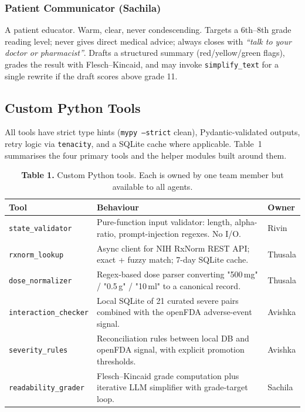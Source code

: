 \documentclass[11pt]{article}
\begin{document}
\subsubsection*{Patient Communicator (Sachila)}
A patient educator. Warm, clear, never condescending. Targets a
6th–8th grade reading level; never gives direct medical advice;
always closes with \emph{``talk to your doctor or pharmacist''}.
Drafts a structured summary (red/yellow/green flags), grades the
result with Flesch–Kincaid, and may invoke \texttt{simplify\_text} for
a single rewrite if the draft scores above grade 11.

\subsection*{Custom Python Tools}

All tools have strict type hints (\texttt{mypy --strict} clean),
Pydantic-validated outputs, retry logic via \texttt{tenacity}, and a
SQLite cache where applicable. Table~1 summarises the four primary
tools and the helper modules built around them.

\begin{table}[h]
\centering
\caption*{\small\textbf{Table 1.} Custom Python tools. Each is owned by one team member but available to all agents.}
\renewcommand{\arraystretch}{1.2}
\small
\begin{tabularx}{\linewidth}{l Y l}
\toprule
\textbf{Tool} & \textbf{Behaviour} & \textbf{Owner} \\
\midrule
\texttt{state\_validator}    & Pure-function input validator: length, alpha-ratio, prompt-injection regexes. No I/O.   & Rivin   \\
\texttt{rxnorm\_lookup}      & Async client for NIH RxNorm REST API; exact + fuzzy match; 7-day SQLite cache.          & Thusala \\
\texttt{dose\_normalizer}    & Regex-based dose parser converting "500\,mg" / "0.5\,g" / "10\,ml" to a canonical record. & Thusala \\
\texttt{interaction\_checker}& Local SQLite of 21 curated severe pairs combined with the openFDA adverse-event signal. & Avishka \\
\texttt{severity\_rules}     & Reconciliation rules between local DB and openFDA signal, with explicit promotion thresholds. & Avishka \\
\texttt{readability\_grader} & Flesch--Kincaid grade computation plus iterative LLM simplifier with grade-target loop.  & Sachila \\
\bottomrule
\end{tabularx}
\end{table}
\end{document}
